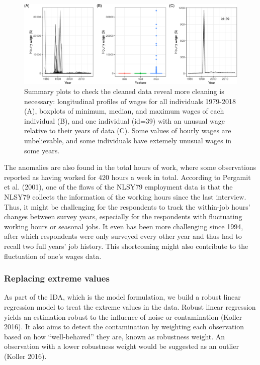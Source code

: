 \documentclass{article}
\begin{document}
\begin{figure}

{\centering \includegraphics[width=1\linewidth]{figures/feature-plot-1} 

}

\caption{Summary plots to check the cleaned data reveal more cleaning is necessary: longitudinal profiles of wages for all individuals 1979-2018 (A), boxplots of minimum, median, and maximum wages of each individual (B), and one individual (id=39) with an unusual wage relative to their years of data (C). Some values of hourly wages are unbelievable, and some individuals have extemely unusual wages in some years.}\label{fig:feature-plot}
\end{figure}

The anomalies are also found in the total hours of work, where some observations reported as having worked for 420 hours a week in total. According to Pergamit et al. (2001), one of the flaws of the NLSY79 employment data is that the NLSY79 collects the information of the working hours since the last interview. Thus, it might be challenging for the respondents to track the within-job hours' changes between survey years, especially for the respondents with fluctuating working hours or seasonal jobs. It even has been more challenging since 1994, after which respondents were only surveyed every other year and thus had to recall two full years' job history. This shortcoming might also contribute to the fluctuation of one's wages data.

\hypertarget{censor}{%
\subsubsection{Replacing extreme values}\label{censor}}

As part of the IDA, which is the model formulation, we build a robust linear regression model to treat the extreme values in the data. Robust linear regression yields an estimation robust to the influence of noise or contamination (Koller 2016). It also aims to detect the contamination by weighting each observation based on how ``well-behaved'' they are, known as robustness weight. An observation with a lower robustness weight would be suggested as an outlier (Koller 2016).
\end{document}

